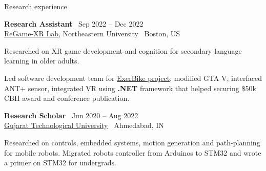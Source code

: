 \documentclass{resume}
\begin{document}
\begin{rSection}{Research experience}
\begin{cvitems}
\end{cvitems}
{\bf Research Assistant} \hfill {\ Sep 2022 -- Dec 2022 }\\ 
{\href{https://regamexr.sites.northeastern.edu/}{ReGame-XR Lab}, Northeastern University} \hfill {\ {Boston, US}}
\begin{cvitems}
    \item Researched on XR game development and cognition for secondary language learning in older adults.
    \item Led software development team for \href{https://games.northeastern.edu/project/exerbike/}{ExerBike project}; modified GTA V, interfaced ANT+ sensor, integrated VR using \textbf{.NET} framework that helped securing \$50k CBH award and conference publication.
\end{cvitems}
{\bf Research Scholar} \hfill {\ Jun 2020 -- Aug 2022 }\\ 
{\href{https://www.gtu.ac.in/}{Gujarat Technological University}} \hfill {\ {Ahmedabad, IN}}
\begin{cvitems}
    \item Researched on controls, embedded systems, motion generation and path-planning for mobile robots. Migrated robots controller from Arduinos to STM32 and wrote a primer on STM32 for undergrads.
\end{cvitems}
\end{rSection}
\end{document}
